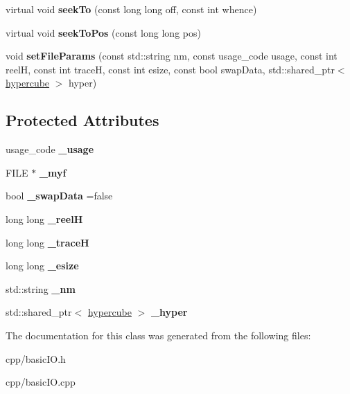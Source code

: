 \begin{DoxyCompactItemize}
virtual void {\bfseries seek\+To} (const long long off, const int whence)
\item 
\mbox{\label{class_s_e_p_1_1basic_i_o_acdc01585926c95448472e823d34ca087}} 
virtual void {\bfseries seek\+To\+Pos} (const long long pos)
\item 
\mbox{\label{class_s_e_p_1_1basic_i_o_a1de73273292af09a356f770eb842a9db}} 
void {\bfseries set\+File\+Params} (const std\+::string nm, const usage\+\_\+code usage, const int reelH, const int traceH, const int esize, const bool swap\+Data, std\+::shared\+\_\+ptr$<$ \hyperlink{class_s_e_p_1_1hypercube}{hypercube} $>$ hyper)
\end{DoxyCompactItemize}
\subsection*{Protected Attributes}
\begin{DoxyCompactItemize}
\item 
\mbox{\label{class_s_e_p_1_1basic_i_o_ade5d914149423ecf34961f36dbaf8f6a}} 
usage\+\_\+code {\bfseries \+\_\+usage}
\item 
\mbox{\label{class_s_e_p_1_1basic_i_o_a50920cbd0a42f1a71448a406f970cf56}} 
F\+I\+LE $\ast$ {\bfseries \+\_\+myf}
\item 
\mbox{\label{class_s_e_p_1_1basic_i_o_a08c226beb776f6c3b00f451b5ff6611d}} 
bool {\bfseries \+\_\+swap\+Data} =false
\item 
\mbox{\label{class_s_e_p_1_1basic_i_o_a6ea437605e0bd6f6939813562e79838b}} 
long long {\bfseries \+\_\+reelH}
\item 
\mbox{\label{class_s_e_p_1_1basic_i_o_a2ba24cba4a7ac9d0bcaf47ee25f258a6}} 
long long {\bfseries \+\_\+traceH}
\item 
\mbox{\label{class_s_e_p_1_1basic_i_o_a1cd64f70ff9cda97c7d927864a61a9a3}} 
long long {\bfseries \+\_\+esize}
\item 
\mbox{\label{class_s_e_p_1_1basic_i_o_a09149e45bd7eee3d187f4dad03c72256}} 
std\+::string {\bfseries \+\_\+nm}
\item 
\mbox{\label{class_s_e_p_1_1basic_i_o_a2a8c7f20fdb24425edf7bc8332c622fa}} 
std\+::shared\+\_\+ptr$<$ \hyperlink{class_s_e_p_1_1hypercube}{hypercube} $>$ {\bfseries \+\_\+hyper}
\end{DoxyCompactItemize}


The documentation for this class was generated from the following files\+:\begin{DoxyCompactItemize}
\item 
cpp/basic\+I\+O.\+h\item 
cpp/basic\+I\+O.\+cpp\end{DoxyCompactItemize}
